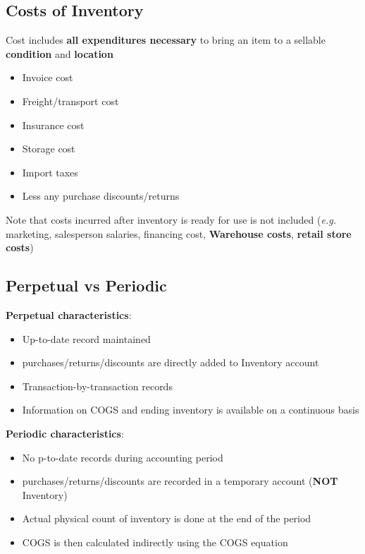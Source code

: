 \documentclass{article}
\newcommand{\eg}[0]{\textit{e.g. }}
\begin{document}
\begin{multicols}{2}
\subsection{Costs of Inventory}
Cost includes \textbf{all expenditures necessary} to bring an item to a sellable \textbf{condition} and \textbf{location}
\begin{itemize}
	\item Invoice cost
	\item Freight/transport cost
	\item Insurance cost
	\item Storage cost
	\item Import taxes
	\item Less any purchase discounts/returns
\end{itemize}
Note that costs incurred after inventory is ready for use is not included (\eg marketing, salesperson salaries, financing cost, \textbf{Warehouse costs}, \textbf{retail store costs})

\subsection{Perpetual vs Periodic}
\textbf{Perpetual characteristics}:
\begin{itemize}
	\item Up-to-date record maintained
	\item purchases/returns/discounts are directly added to Inventory account
	\item Transaction-by-transaction records
	\item Information on COGS and ending inventory is available on a continuous basis
\end{itemize}
\textbf{Periodic characteristics}:
\begin{itemize}
	\item No p-to-date records during accounting period
	\item purchases/returns/discounts are recorded in a temporary account (\textbf{NOT} Inventory)
	\item Actual physical count of inventory is done at the end of the period
	\item COGS is then calculated indirectly using the COGS equation
\end{itemize}


\end{multicols}
\end{document}
